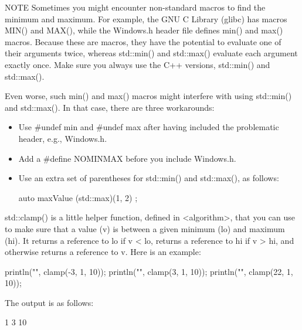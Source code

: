 \begin{myNotic}{NOTE}
Sometimes you might encounter non-standard macros to find the minimum and maximum. For example, the GNU C Library (glibc) has macros MIN() and MAX(), while the Windows.h header file defines min() and max() macros. Because these are macros, they have the potential to evaluate one of their arguments twice, whereas std::min() and std::max() evaluate each argument exactly once. Make sure you always use the C++ versions, std::min() and std::max().

Even worse, such min() and max() macros might interfere with using std::min() and std::max(). In that case, there are three workarounds:

\begin{itemize}
\item
Use \#undef min and \#undef max after having included the problematic header, e.g., Windows.h.

\item
Add a \#define NOMINMAX before you include Windows.h.

\item
Use an extra set of parentheses for std::min() and std::max(), as follows:

\begin{cpp}
auto maxValue { (std::max)(1, 2) };
\end{cpp}
\end{itemize}
\end{myNotic}

std::clamp() is a little helper function, defined in <algorithm>, that you can use to make sure that a value (v) is between a given minimum (lo) and maximum (hi). It returns a reference to lo if v < lo, returns a reference to hi if v > hi, and otherwise returns a reference to v. Here is an example:

\begin{cpp}
println("{}", clamp(-3, 1, 10));
println("{}", clamp(3, 1, 10));
println("{}", clamp(22, 1, 10));
\end{cpp}

The output is as follows:

\begin{shell}
1
3
10
\end{shell}















